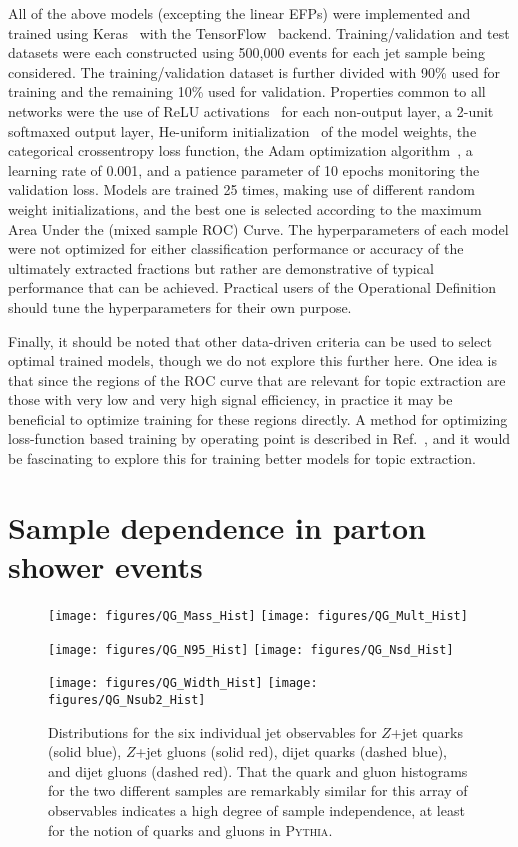 \documentclass[letterpaper,11pt]{article}
\DeclareRobustCommand{\Ref}[1]{Ref.~\cite{#1}}
\newcommand{\pythia}{\textsc{Pythia}\xspace}
\begin{document}
All of the above models (excepting the linear EFPs) were implemented and trained using Keras~\cite{keras} with the TensorFlow~\cite{tensorflow} backend.
%
Training/validation and test datasets were each constructed using 500,000 events for each jet sample being considered.
%
The training/validation dataset is further divided with 90\% used for training and the remaining 10\% used for validation. 
%
Properties common to all networks were the use of ReLU activations~\cite{nair2010rectified} for each non-output layer, a 2-unit softmaxed output layer, He-uniform initialization~\cite{heuniform} of the model weights, the categorical crossentropy loss function, the Adam optimization algorithm~\cite{adam}, a learning rate of 0.001, and a patience parameter of 10 epochs monitoring the validation loss.
%
Models are trained 25 times, making use of different random weight initializations, and the best one is selected according to the maximum Area Under the (mixed sample ROC) Curve.
%
The hyperparameters of each model were not optimized for either classification performance or accuracy of the ultimately extracted fractions but rather are demonstrative of typical performance that can be achieved.
%
Practical users of the Operational Definition should tune the hyperparameters for their own purpose. 


Finally, it should be noted that other data-driven criteria can be used to select optimal trained models, though we do not explore this further here.
%
One idea is that since the regions of the ROC curve that are relevant for topic extraction are those with very low and very high signal efficiency, in practice it may be beneficial to optimize training for these regions directly.
%
A method for optimizing loss-function based training by operating point is described in \Ref{rocopt}, and it would be fascinating to explore this for training better models for topic extraction.



\section{Sample dependence in parton shower events}
\label{sec:sampledependence}

\begin{figure}[p]
\centering
\texttt{[image: figures/QG\_Mass\_Hist]}
\texttt{[image: figures/QG\_Mult\_Hist]}

\texttt{[image: figures/QG\_N95\_Hist]}
\texttt{[image: figures/QG\_Nsd\_Hist]}

\texttt{[image: figures/QG\_Width\_Hist]}
\texttt{[image: figures/QG\_Nsub2\_Hist]}

\caption{Distributions for the six individual jet observables for $Z$+jet quarks (solid blue), $Z$+jet gluons (solid red), dijet quarks (dashed blue), and dijet gluons (dashed red). 
%
That the quark and gluon histograms for the two different samples are remarkably similar for this array of observables indicates a high degree of sample independence, at least for the notion of quarks and gluons in \pythia.}
\label{fig:qgobshists}
\end{figure}
\end{document}

